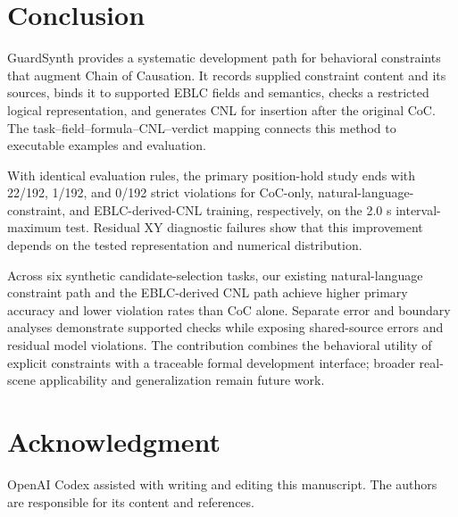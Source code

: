 \documentclass[nolineno]{ieeeaccess}
\begin{document}
\section{Conclusion}

GuardSynth provides a systematic development path for behavioral constraints that augment Chain of Causation. It records supplied constraint content and its sources, binds it to supported EBLC fields and semantics, checks a restricted logical representation, and generates CNL for insertion after the original CoC. The task--field--formula--CNL--verdict mapping connects this method to executable examples and evaluation.\par

With identical evaluation rules, the primary position-hold study ends with 22/192, 1/192, and 0/192 strict violations for CoC-only, natural-language-constraint, and EBLC-derived-CNL training, respectively, on the 2.0 s interval-maximum test. Residual XY diagnostic failures show that this improvement depends on the tested representation and numerical distribution.\par

Across six synthetic candidate-selection tasks, our existing natural-language constraint path and the EBLC-derived CNL path achieve higher primary accuracy and lower violation rates than CoC alone. Separate error and boundary analyses demonstrate supported checks while exposing shared-source errors and residual model violations. The contribution combines the behavioral utility of explicit constraints with a traceable formal development interface; broader real-scene applicability and generalization remain future work.\par
\section*{Acknowledgment}
OpenAI Codex assisted with writing and editing this manuscript. The authors are responsible for its content and references.\cite{r15}


\EOD
\end{document}
